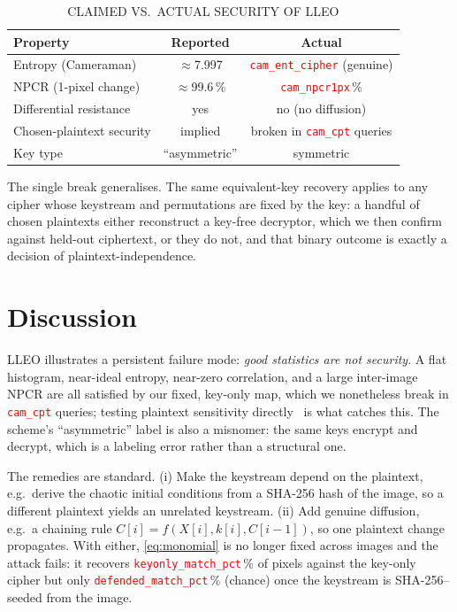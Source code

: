 \documentclass[conference,a4paper]{IEEEtran}
\newcommand{\PH}[1]{\textcolor{red}{\texttt{#1}}}
\begin{document}
\begin{table}[htbp]
\centering
\caption{CLAIMED VS.\ ACTUAL SECURITY OF LLEO}
\label{tab:claims}
\begin{tabular}{|l|c|c|}
\hline
\textbf{Property} & \textbf{Reported} & \textbf{Actual} \\
\hline
Entropy (Cameraman)        & $\approx$7.997 & \PH{cam_ent_cipher} (genuine) \\
\hline
NPCR (1-pixel change)      & $\approx$99.6\,\% & \PH{cam_npcr1px}\,\% \\
\hline
Differential resistance    & yes & no (no diffusion) \\
\hline
Chosen-plaintext security  & implied & broken in \PH{cam_cpt} queries \\
\hline
Key type                   & ``asymmetric'' & symmetric \\
\hline
\end{tabular}
\end{table}

The single break generalises. The same equivalent-key recovery applies to any cipher whose keystream and
permutations are fixed by the key: a handful of chosen plaintexts either reconstruct a key-free decryptor,
which we then confirm against held-out ciphertext, or they do not, and that binary outcome is exactly a
decision of plaintext-independence.

\section{Discussion}
LLEO illustrates a persistent failure mode: \emph{good statistics are not security}. A flat histogram,
near-ideal entropy, near-zero correlation, and a large inter-image NPCR are all satisfied by our fixed,
key-only map, which we nonetheless break in \PH{cam_cpt} queries; testing plaintext sensitivity
directly~\cite{alvarez2006,wu2011npcr} is what catches this. The scheme's ``asymmetric'' label is also a misnomer: the same keys encrypt and decrypt, which is a labeling error rather than a structural one.

The remedies are standard. (i) Make the keystream depend on the plaintext, e.g.\ derive the chaotic
initial conditions from a SHA-256 hash of the image, so a different plaintext yields an unrelated
keystream. (ii) Add genuine diffusion, e.g.\ a chaining rule $C[i]=f(X[i],k[i],C[i-1])$, so one
plaintext change propagates. With either, \eqref{eq:monomial} is no longer fixed across images and the
attack fails: it recovers \PH{keyonly_match_pct}\,\% of pixels against the key-only cipher but only
\PH{defended_match_pct}\,\% (chance) once the keystream is SHA-256--seeded from the image.
\end{document}
